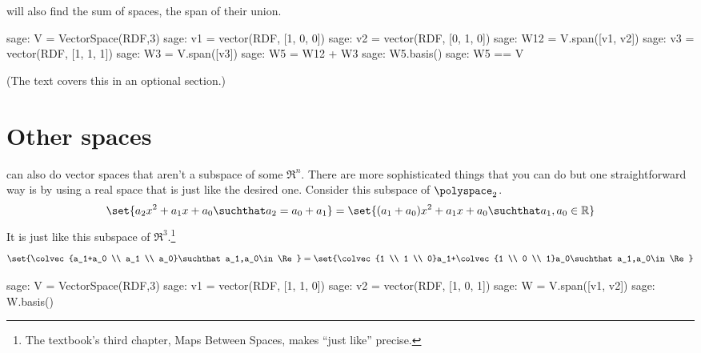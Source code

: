 \Sage{} will also find the sum of spaces, the span of their union.
\begin{sagecommandline}
sage: V = VectorSpace(RDF,3)
sage: v1 = vector(RDF, [1, 0, 0])
sage: v2 =  vector(RDF, [0, 1, 0])
sage: W12 = V.span([v1, v2])
sage: v3 = vector(RDF, [1, 1, 1])
sage: W3 = V.span([v3])
sage: W5 = W12 + W3
sage: W5.basis()
sage: W5 == V
\end{sagecommandline}
(The text covers this in an optional section.)





\section{Other spaces}

\Sage{} can also do vector spaces that aren't a subspace of some $\Re^n$.
There are more sophisticated things that you can do but
one straightforward way is 
by using a real space that is just like the desired one.
Consider this subspace of 
$\polyspace_2$.
\begin{equation*}
  \set{ a_2x^2+a_1x+a_0\suchthat a_2=a_0+a_1}           
   =\set{ (a_1+a_0)x^2+a_1x+a_0 \suchthat a_1,a_0\in\Re}
\end{equation*}
It is just like
this subspace of $\Re^3$.\footnote{%
  The textbook's 
  third chapter, Maps Between Spaces, makes 
  ``just like'' precise.}
\begin{equation*}
  \set{\colvec{a_1+a_0 \\ a_1 \\ a_0}\suchthat a_1,a_0\in\Re}
  =\set{\colvec{1 \\ 1 \\ 0}a_1+\colvec{1 \\ 0 \\ 1}a_0\suchthat a_1,a_0\in\Re}
\end{equation*}
\begin{sagecommandline}
sage: V = VectorSpace(RDF,3)
sage: v1 = vector(RDF, [1, 1, 0])
sage: v2 = vector(RDF, [1, 0, 1])
sage: W = V.span([v1, v2])
sage: W.basis()
\end{sagecommandline}

